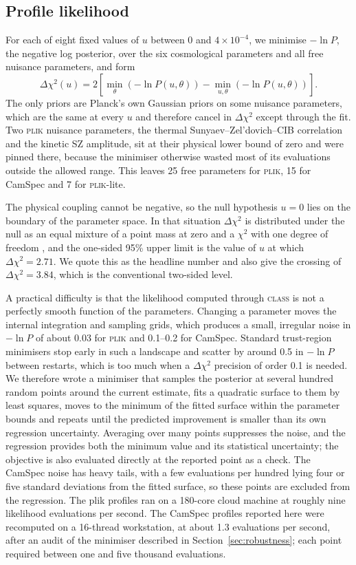 \documentclass[11pt,a4paper]{article}
\newcommand{\dchi}{\Delta\chi^2}
\begin{document}
\subsection{Profile likelihood}

For each of eight fixed values of $u$ between 0 and $4\times10^{-4}$, we minimise $-\ln P$, the negative log posterior, over the six cosmological parameters and all free nuisance parameters, and form
\begin{equation}
\dchi(u) = 2\left[\min_{\theta}\left(-\ln P(u,\theta)\right) - \min_{u,\theta}\left(-\ln P(u,\theta)\right)\right].
\end{equation}
The only priors are Planck's own Gaussian priors on some nuisance parameters, which are the same at every $u$ and therefore cancel in $\dchi$ except through the fit. Two \textsc{plik} nuisance parameters, the thermal Sunyaev--Zel'dovich--CIB correlation and the kinetic SZ amplitude, sit at their physical lower bound of zero and were pinned there, because the minimiser otherwise wasted most of its evaluations outside the allowed range. This leaves 25 free parameters for \textsc{plik}, 15 for CamSpec and 7 for \textsc{plik}-lite.

The physical coupling cannot be negative, so the null hypothesis $u=0$ lies on the boundary of the parameter space. In that situation $\dchi$ is distributed under the null as an equal mixture of a point mass at zero and a $\chi^2$ with one degree of freedom \citep{Chernoff1954}, and the one-sided 95\% upper limit is the value of $u$ at which $\dchi = 2.71$. We quote this as the headline number and also give the crossing of $\dchi = 3.84$, which is the conventional two-sided level.

A practical difficulty is that the likelihood computed through \textsc{class} is not a perfectly smooth function of the parameters. Changing a parameter moves the internal integration and sampling grids, which produces a small, irregular noise in $-\ln P$ of about 0.03 for \textsc{plik} and 0.1--0.2 for CamSpec. Standard trust-region minimisers stop early in such a landscape and scatter by around 0.5 in $-\ln P$ between restarts, which is too much when a $\dchi$ precision of order 0.1 is needed. We therefore wrote a minimiser that samples the posterior at several hundred random points around the current estimate, fits a quadratic surface to them by least squares, moves to the minimum of the fitted surface within the parameter bounds and repeats until the predicted improvement is smaller than its own regression uncertainty. Averaging over many points suppresses the noise, and the regression provides both the minimum value and its statistical uncertainty; the objective is also evaluated directly at the reported point as a check. The CamSpec noise has heavy tails, with a few evaluations per hundred lying four or five standard deviations from the fitted surface, so these points are excluded from the regression. The plik profiles ran on a 180-core cloud machine at roughly nine likelihood evaluations per second. The CamSpec profiles reported here were recomputed on a 16-thread workstation, at about 1.3 evaluations per second, after an audit of the minimiser described in Section~\ref{sec:robustness}; each point required between one and five thousand evaluations.
\end{document}

